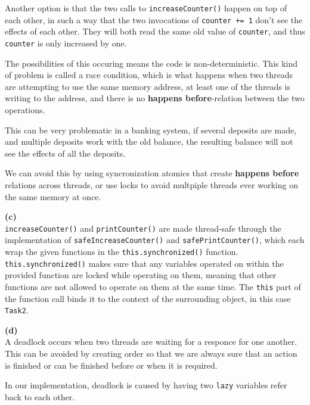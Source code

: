 \documentclass[12pt]{article}
\newcommand{\subtask}[1]{\hspace*{-1cm}\textbf{(#1)}\\[-5mm]}
\begin{document}
Another option is that the two calls to \verb|increaseCounter()| happen on top of each other,
in such a way that the two invocations of \verb|counter += 1| don't see the effects of each other.
They will both read the same old value of \verb|counter|, and thus \verb|counter| is only increased by one.

The possibilities of this occuring means the code is non-deterministic.
This kind of problem is called a race condition, which is what happens when
two threads are attempting to use the same memory address,
at least one of the threads is writing to the address,
and there is no \textbf{happens before}-relation between the two operations.

This can be very problematic in a banking system, if several deposits are made,
and multiple deposits work with the old balance, the resulting balance will not
see the effects of all the deposits.

We can avoid this by using syncronization atomics that create \textbf{happens before}
relations across threads, or use locks to avoid multpiple threads ever working on the same memory at once.

\subtask{c}
\verb|increaseCounter()| and \verb|printCounter()| are made thread-safe through the implementation of \verb|safeIncreaseCounter()| and \verb|safePrintCounter()|, which each wrap the given functions in the \verb|this.synchronized()| function. \verb|this.synchronized()| makes sure that any variables operated on within the provided function are locked while operating on them, meaning that other functions are not allowed to operate on them at the same time. The \verb|this| part of the function call binds it to the context of the surrounding object, in this case \verb|Task2|.

\subtask{d}
A deadlock occurs when two threads are waiting for a responce for one another.
This can be avoided by creating order so that we are always sure that an action is finished or can be finished before or when it is required.

In our implementation, deadlock is caused by having two \verb|lazy| variables refer back to each other.
\end{document}
